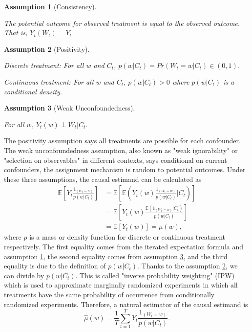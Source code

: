 \documentclass[12pt]{article}
\newtheorem{asm}{Assumption}
\begin{document}
\begin{asm}[Consistency]\label{asm:consistency}\hfill

	The potential outcome for observed treatment is equal to the observed outcome.
	That is, $Y_t(W_t) = Y_t$.
\end{asm}

\begin{asm}[Positivity]\label{asm:positivity}\hfill

	Discrete treatment:
	For all $w$ and $C_t$, $p(w\lvert C_t) = Pr\left ( W_t = w \lvert C_t\right ) \in (0, 1)$.

	Continuous treatment:
	For all $w$ and $C_t$, $p(w\lvert C_t) > 0$ where $p(w\lvert C_t)$ is a conditional density.
\end{asm}


\begin{asm}[Weak Unconfoundedness]\label{asm:unconfoundedness} \hfill

	For all $w$, $Y_{t}(w) \perp W_t \lvert C_t$.
\end{asm}


The positivity assumption says all treatments are possible for each confounder.
The weak unconfoundedness assumption, 
also known as "weak ignorability" or "selection on observables" in different contexts, says
conditional on current confounders, the assignment mechanism is random to potential outcomes.
Under these three assumptions, the causal estimand can be calculated as
\[
	\begin{split}
		\mathbb{E}\left[ Y_t\frac{1_{(W_t = w)}}{p(w\lvert C_t)} \right]
		& = \mathbb{E}\left[ \mathbb{E}\left( Y_t(w) \frac{1_{(W_t = w)}}{p(w\lvert C_t)} \lvert C_t\right)\right]\\
		& = \mathbb{E}\left[ Y_t(w)\frac{\mathbb{E}\left( 1_{(W_t = w)}\lvert C_t \right)}{p(w\lvert C_t)} \right]\\
		& = \mathbb{E}\left[ Y_t(w) \right] = \mu(w),
	\end{split}
\]
where $p$ is a mass or density function for discrete or continuous treatment respectively.
The first equality comes from the iterated expectation formula and assumption \ref{asm:consistency},
the second equality comes from assumption \ref{asm:unconfoundedness},
and the third equality is due to the definition of $p(w\lvert C_t)$.
Thanks to the assumption \ref{asm:positivity}, we can divide by $p(w\lvert C_t)$.
This is called "inverse probability weighting" (IPW)
which is used to approximate marginally randomized experiments
in which all treatments have the same probability of occurrence
from conditionally randomized experiments.
Therefore, a natural estimator of the causal estimand is
\[
	\hat{\mu}(w) = \frac{1}{T}\sum_{t = 1}^T Y_t \frac{1_{(W_t = w)}}{p(w\lvert C_t)}.
\]
\end{document}
